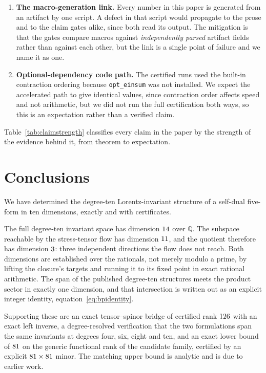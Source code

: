 \documentclass[11pt,a4paper]{article}
\theoremstyle{definition}
\theoremstyle{remark}
\newcommand{\Q}{\mathbb{Q}}
\begin{document}
\begin{enumerate}
\item \textbf{The macro-generation link.} Every number in this paper is
generated from an artifact by one script. A defect in that script would
propagate to the prose and to the claim gates alike, since both read its output.
The mitigation is that the gates compare macros against \emph{independently
parsed} artifact fields rather than against each other, but the link is a single
point of failure and we name it as one.

\item \textbf{Optional-dependency code path.} The certified runs used the
built-in contraction ordering because \texttt{opt\_einsum} was not installed. We
expect the accelerated path to give identical values, since contraction order
affects speed and not arithmetic, but we did not run the full certification both
ways, so this is an expectation rather than a verified claim.

\end{enumerate}

Table~\ref{tab:claimstrength} classifies every claim in the paper by the
strength of the evidence behind it, from theorem to expectation.



\section{Conclusions}
\label{sec:conclusions}

We have determined the degree-ten Lorentz-invariant structure of a self-dual
five-form in ten dimensions, exactly and with certificates.

The full degree-ten invariant space has dimension $14$ over $\Q$. The
subspace reachable by the stress-tensor flow has dimension $11$, and the
quotient therefore has dimension $3$: three independent directions the
flow does not reach. Both dimensions are established over the rationals, not
merely modulo a prime, by lifting the closure's targets and running it to its
fixed point in exact rational arithmetic. The span of the published degree-ten
structures meets the product sector in exactly one dimension, and that
intersection is written out as an explicit integer identity,
equation~\eqref{eq:bpidentity}.

Supporting these are an exact tensor--spinor bridge of certified rank
$126$ with an exact left inverse, a degree-resolved verification
that the two formulations span the same invariants at degrees four, six, eight
and ten, and an exact lower bound of $81$ on the generic
functional rank of the candidate family, certified by an explicit
$81\times81$ minor. The matching upper bound is analytic and is
due to earlier work.
\end{document}
